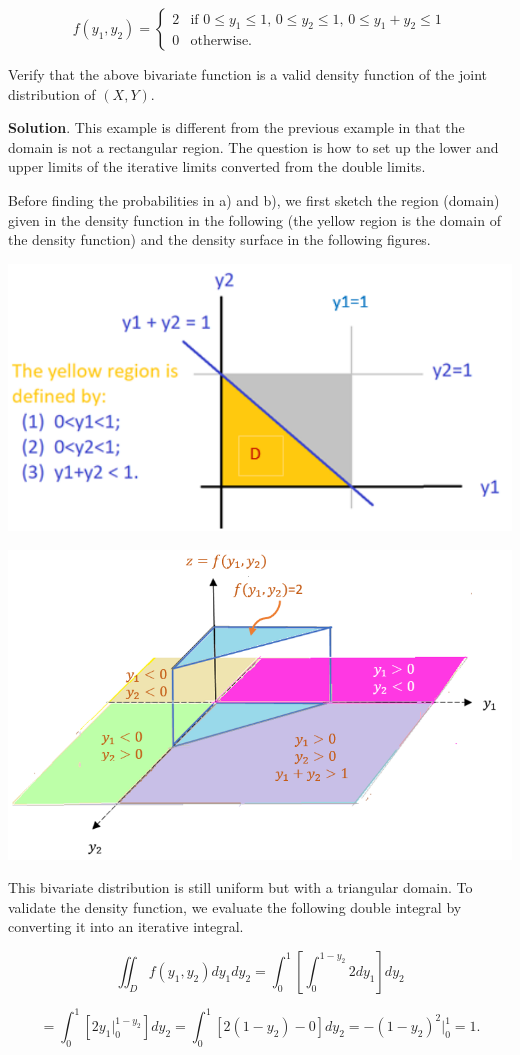 \documentclass[
]{book}
\begin{document}
\[
\displaystyle f(y_1, y_2) = \begin{cases} 
 2 & \text{if $0 \le y_1 \le 1$, $0 \le y_2 \le 1$, $0 \le y_1 +y_2 \le 1$} \\  
 0 & \text{otherwise}.
 \end{cases}
\]

Verify that the above bivariate function is a valid density function of the joint distribution of \((X, Y)\).

\textbf{Solution}. This example is different from the previous example in that the domain is not a rectangular region. The question is how to set up the lower and upper limits of the iterative limits converted from the double limits.

Before finding the probabilities in a) and b), we first sketch the region (domain) given in the density function in the following (the yellow region is the domain of the density function) and the density surface in the following figures.

\begin{center}\includegraphics[width=0.4\linewidth]{topic06/example03DensityBase} \end{center}

\begin{center}\includegraphics[width=0.4\linewidth]{topic06/example03DensitySurface} \end{center}

This bivariate distribution is still uniform but with a triangular domain. To validate the density function, we evaluate the following double integral by converting it into an iterative integral.

\[
\iint_D f(y_1,y_2)dy_1dy_2 = \int_0^1 \left[ \int_0^{1-y_2}2 dy_1 \right] dy_2 
\]

\[
= \int_0^1\left[2y_1\Big|_0^{1-y_2}\right]dy_2 = \int_0^1 \left[2(1-y_2) -0\right]dy_2 = -(1-y_2)^2\Big|_0^1 = 1.
\]
\end{document}
